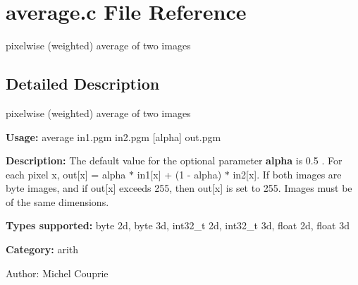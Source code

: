 \section{average.c File Reference}
\label{average_8c}
pixelwise (weighted) average of two images 



\subsection{Detailed Description}
pixelwise (weighted) average of two images 

{\bf Usage:} average in1.pgm in2.pgm [alpha] out.pgm

{\bf Description:} The default value for the optional parameter {\bf alpha} is 0.5 . For each pixel x, out[x] = alpha $\ast$ in1[x] + (1 - alpha) $\ast$ in2[x]. If both images are byte images, and if out[x] exceeds 255, then out[x] is set to 255. Images must be of the same dimensions.

{\bf Types supported:} byte 2d, byte 3d, int32\_\-t 2d, int32\_\-t 3d, float 2d, float 3d

{\bf Category:} arith

\begin{Desc}
\item[Author:]Michel Couprie \end{Desc}
